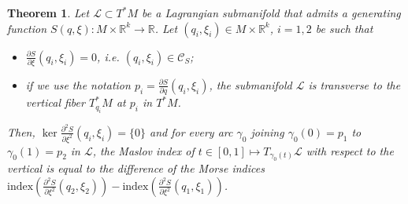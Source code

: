\documentclass[10pt,a4paper]{amsart}
\numberwithin{equation}{section}
\newcommand*\cC{\mathcal{C}}
\newcommand*\cl{\mathcal{L}}
\newcommand*\R{\mathbb{R}}
\newtheorem{theo}{Theorem}[section]
\theoremstyle{definition}
\theoremstyle{remark}
\begin{document}
\begin{theo}\label{Tmain}
Let $\cl\subset T^*M$ be a Lagrangian submanifold that admits a generating function $S(q, \xi):M\times \R^k\rightarrow \R$. Let $(q_i, \xi_i)\in M\times \R^k$, $i= 1, 2$ be such that
\begin{itemize}
\item $\frac{\partial S}{\partial \xi}(q_i, \xi_i)=0$, i.e. $(q_i,\xi_i)\in \cC_S$;
\item if we use the notation $p_i= \frac{\partial S}{\partial q}(q_i, \xi_i)$, the submanifold $\cl$ is transverse to the vertical fiber $T^*_{q_i}M$ at $p_i$ in $T^*M$.
\end{itemize}
Then, $\ker \frac{\partial^2 S}{\partial \xi^2}(q_i, \xi_i)=\{ 0\}$ and for every arc $\gamma_0$ joining $\gamma_0(0)=p_1$ to $\gamma_0 (1)=p_2$ in $\cl$, the Maslov index of $t\in [0, 1]\mapsto T_{\gamma_0 (t)}\cl$ with respect to the vertical is equal to the difference of the Morse indices $\text{index}(\frac{\partial^2 S}{\partial \xi^2}(q_2, \xi_2))-\text{index}(\frac{\partial^2 S}{\partial \xi^2}(q_1, \xi_1))$.
\end{theo}
\end{document}
